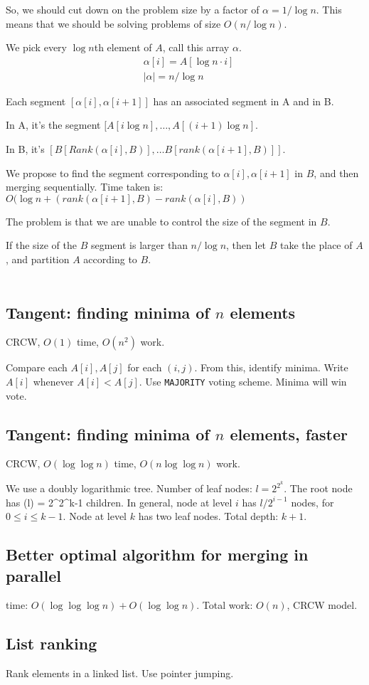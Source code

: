 So, we should cut down on the problem size by a factor of $\alpha = 1/\log n$.
This means that we should be solving problems of size $O(n / \log n)$.


We pick every $\log n$th element of $A$, call this array $\alpha$.  
\begin{align*}
&\alpha[i] = A[\log n \cdot i] \\
&|\alpha| = n / \log n
\end{align*}

Each segment $[\alpha[i], \alpha[i+1]]$ has an associated segment in A and in B. 

In A, it's the segment $[A[i \log n], \dots, A[(i + 1) \log n]$.

In B, it's $[B[Rank(\alpha[i], B)], \dots B[rank(\alpha[i+1], B)]]$.

We propose to find the segment corresponding to $\alpha[i], \alpha[i+1]$ in $B$,
and then merging sequentially. Time taken is: $O(\log n + (rank(\alpha[i+1], B) - rank(\alpha[i], B))$

The problem is that we are unable to control the size of the segment in $B$.

If the size of the $B$ segment is larger than $n / \log n$, then let $B$
take the place of $A$, and partition $A$ according to $B$.


\begin{align*}
\end{align*}

\subsection{Tangent: finding minima of $n$ elements}
CRCW, $O(1)$ time, $O(n^2)$ work.

Compare each $A[i], A[j]$ for each $(i, j)$. From this, identify minima.
Write $A[i]$ whenever $A[i] < A[j]$. Use \texttt{MAJORITY} voting scheme.
Minima will win vote.


\subsection{Tangent: finding minima of $n$ elements, faster}
CRCW, $O(\log \log n)$ time, $O(n \log \log n)$ work.

We use a doubly logarithmic tree. Number of leaf nodes: $l = 2^2^k$. The root node
has \sqrt(l) = 2^{2^{k-1}} children. In general, node at level $i$ has $l / 2^{i - 1}$ nodes,
for $0 \leq i \leq k - 1$. Node at level $k$ has two leaf nodes. Total depth: $k + 1$.



\subsection{Better optimal algorithm for merging in parallel}
time: $O(\log \log \log n) + O(\log \log n)$. Total work: $O(n)$, CRCW model.

\subsection{List ranking}
Rank elements in a linked list.
Use pointer jumping.


